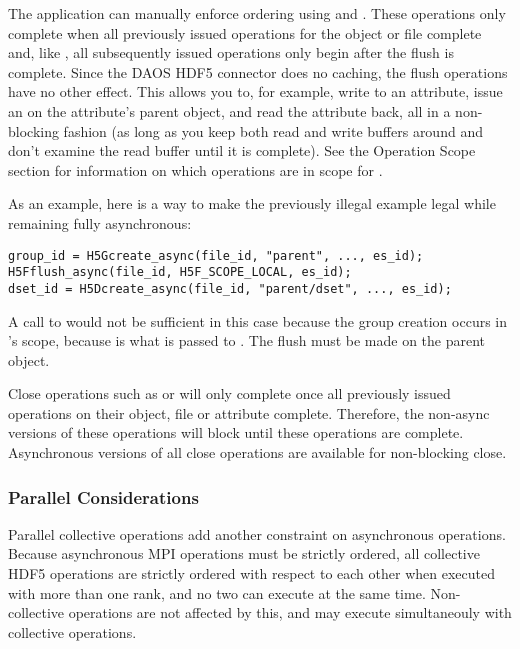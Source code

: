 \documentclass[../users_guide.tex]{subfiles}
\begin{document}
The application can manually enforce ordering using
 and . These
operations only complete when all previously issued operations for the object or
file complete and, like , all subsequently
issued operations only begin after the flush is complete. Since the DAOS HDF5
connector does no caching, the flush operations have no other effect. This
allows you to, for example, write to an attribute, issue an
 on the attribute's parent object, and read the
attribute back, all in a non-blocking fashion (as long as you keep both read and
write buffers around and don't examine the read buffer until it is complete).
See the Operation Scope section for information on which operations are in scope
for .

As an example, here is a way to make the previously illegal example legal while
remaining fully asynchronous:

\begin{verbatim}
group_id = H5Gcreate_async(file_id, "parent", ..., es_id);
H5Fflush_async(file_id, H5F_SCOPE_LOCAL, es_id);
dset_id = H5Dcreate_async(file_id, "parent/dset", ..., es_id);
\end{verbatim}

A call to  would not be sufficient
in this case because the group creation occurs in 's scope,
because  is what is passed to
. The flush must be made on the parent object.

Close operations such as  or 
will only complete once all previously issued operations on their object, file
or attribute complete. Therefore, the non-async versions of these operations
will block until these operations are complete. Asynchronous versions of all
close operations are available for non-blocking close.

\subsubsection {Parallel Considerations}

Parallel collective operations add another constraint on asynchronous
operations. Because asynchronous MPI operations must be strictly ordered, all
collective HDF5 operations are strictly ordered with respect to each other when
executed with more than one rank, and no two can execute at the same time.
Non-collective operations are not affected by this, and may execute
simultaneouly with collective operations.
\end{document}
